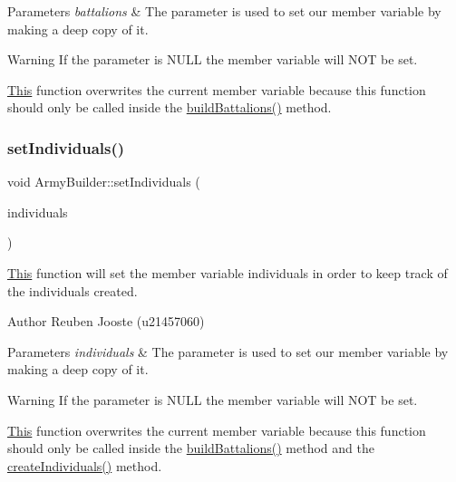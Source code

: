 \begin{DoxyParams}{Parameters}
{\em battalions} & The parameter is used to set our member variable by making a deep copy of it. \\
\hline
\end{DoxyParams}
\begin{DoxyWarning}{Warning}
If the parameter is N\+U\+LL the member variable will N\+OT be set. 

\mbox{\hyperlink{class_this}{This}} function overwrites the current member variable because this function should only be called inside the \mbox{\hyperlink{class_army_builder_a4ff1c6808926f65820eceaf9adab2c16}{build\+Battalions()}} method. 
\end{DoxyWarning}
\mbox{\label{class_army_builder_aac7a2b1a5012fe2e9ff810636e53acf5}} 
\subsubsection{\texorpdfstring{setIndividuals()}{setIndividuals()}}
{\footnotesize\ttfamily void Army\+Builder\+::set\+Individuals (\begin{DoxyParamCaption}\item[{std\+::vector$<$ \mbox{\hyperlink{class_army_component}{Army\+Component}} $\ast$ $>$ $\ast$}]{individuals }\end{DoxyParamCaption})}



\mbox{\hyperlink{class_this}{This}} function will set the member variable individuals in order to keep track of the individuals created. 

\begin{DoxyAuthor}{Author}
Reuben Jooste (u21457060) 
\end{DoxyAuthor}

\begin{DoxyParams}{Parameters}
{\em individuals} & The parameter is used to set our member variable by making a deep copy of it. \\
\hline
\end{DoxyParams}
\begin{DoxyWarning}{Warning}
If the parameter is N\+U\+LL the member variable will N\+OT be set. 

\mbox{\hyperlink{class_this}{This}} function overwrites the current member variable because this function should only be called inside the \mbox{\hyperlink{class_army_builder_a4ff1c6808926f65820eceaf9adab2c16}{build\+Battalions()}} method and the \mbox{\hyperlink{class_army_builder_aefae08ee6f43f41d94d06891ad6fdbbb}{create\+Individuals()}} method. 
\end{DoxyWarning}
\mbox{\label{class_army_builder_ae8871d3c278ba62825e45fddcab90bb4}} 
